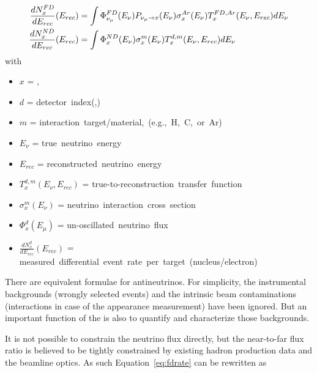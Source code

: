 \begin{align}
\label{eq:fdrate}
\frac{dN^{FD}_{x}}{dE_{rec}}(E_{rec}) & = 
\int \Phi^{FD}_{\nu_\mu}(E_\nu)P_{\nu_\mu\rightarrow x}(E_\nu)\sigma^{Ar}_x(E_\nu)T^{FD,Ar}_x(E_\nu,E_{rec})dE_\nu\\
\frac{dN^{ND}_{x}}{dE_{rec}}(E_{rec}) & = 
\int \Phi^{ND}_{x}(E_\nu)\sigma^m_x(E_\nu)T^{d,m}_x(E_\nu,E_{rec})dE_\nu\
\end{align}
with
\begin{itemize}
    \item $x$  = \nue , \numu 
   \item $d$  = \mbox{detector index}(,) 
   \item $m$  = \mbox{interaction target/material, (e.g., H, C, or Ar)}
   \item $E_\nu$  = \mbox{true neutrino energy}
   \item $E_{rec}$  = \mbox{reconstructed neutrino energy} 
   \item $T^{d,m}_x(E_\nu,E_{rec})$  = \mbox{true-to-reconstruction transfer function} 
   \item $\sigma^m_x(E_\nu)$  = \mbox{neutrino interaction cross section} 
   \item $\Phi^{d}_x(E_\mu)$  = \mbox{un-oscillated neutrino flux} 
   \item $\frac{dN^{d}_{x}}{dE_{rec}}(E_{rec})$  = \mbox{measured differential event rate per target (nucleus/electron)} 
\end{itemize}


There are equivalent formulae for antineutrinos. For simplicity, the instrumental backgrounds (wrongly selected events) and the intrinsic beam contaminations (\nue interactions in case of the appearance measurement) have been ignored. But an important function of the   is also to quantify and characterize those backgrounds.

It is not possible to constrain the  neutrino flux directly, but the near-to-far flux ratio is believed to be tightly constrained by existing hadron production data and the beamline optics. As such Equation~\ref{eq:fdrate} can be rewritten as 


